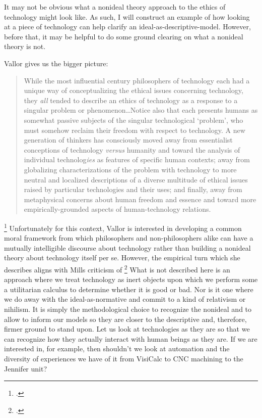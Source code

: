 \documentclass[letterpaper,notitlepage,12pt]{article}
\begin{document}
It may not be obvious what a nonideal theory approach to the ethics of
technology might look like.
As such, I will construct an example of how looking at a piece of technology can
help clarify an ideal-as-descriptive-model.
However, before that, it may be helpful to do some ground clearing on what a
nonideal theory is not.

Vallor gives us the bigger picture: \blockquote{While the most influential
  \nth{20]} century philosophers of technology each had a unique way of
  conceptualizing the ethical issues concerning technology, they \textit{all}
  tended to describe an ethics of technology as a response to a singular problem
  or phenomenon\ldots Notice also that each presents humans as somewhat passive
  subjects of the singular technological `problem', who must somehow reclaim
  their freedom with respect to technology. A new generation of thinkers has
  consciously moved away from essentialist conceptions of technology
  \textit{versus} humanity and toward the analysis of individual
  technolog\textit{ies} as features of specific human contexts; away from
  globalizing characterizations of the problem with technology to more neutral
  and localized descriptions of a diverse multitude of ethical issues raised by
  particular technologies and their uses; and finally, away from metaphysical
  concerns about human freedom and essence and toward more empirically-grounded
aspects of human-technology relations.}\footcite[p. 31]{vallor_technology_2018}
Unfortunately for this context, Vallor is interested in developing a common
moral framework from which philosophers and non-philosophers alike can have a
mutually intelligible discourse about technology rather than building a nonideal
theory about technology itself per se.
However, the empirical turn which she describes aligns with Mills criticism of
\footcite[p. 168]{mills_ideal_2005}
What is not described here is an approach where we treat technology as inert
objects upon which we perform some a utilitarian calculus to determine whether
it is good or bad.
Nor is it one where we do away with the ideal-as-normative and commit to a kind
of relativism or nihilism.
It is simply the methodological choice to recognize the nonideal and to allow to
inform our models so they are closer to the descriptive and, therefore, firmer
ground to stand upon.
Let us look at technologies as they are so that we can recognize how they
actually interact with human beings as they are.
If we are interested in, for example, then shouldn't we look at automation and
the diversity of experiences we have of it from VisiCalc to CNC machining to the
Jennifer unit?
\end{document}
